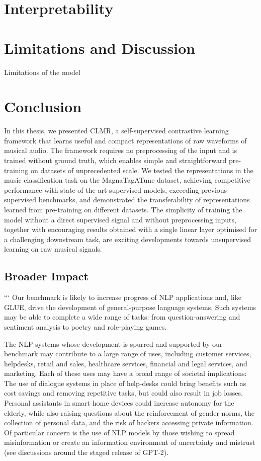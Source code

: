 \documentclass{report}
\begin{document}
\chapter{Interpretability}


\chapter{Limitations and Discussion}
Limitations of the model


\chapter{Conclusion}
In this thesis, we presented CLMR, a self-supervised contrastive learning framework that learns useful and compact representations of raw waveforms of musical audio. The framework requires no preprocessing of the input and is trained without ground truth, which enables simple and straightforward pre-training on datasets of unprecedented scale. We tested the representations in the music classification task on the MagnaTagATune dataset, achieving competitive performance with state-of-the-art supervised models, exceeding previous supervised benchmarks, and demonstrated the transferability of representations learned from pre-training on different datasets. The simplicity of training the model without a direct supervised signal and without preprocessing inputs, together with encouraging results obtained with a single linear layer optimised for a challenging downstream task, are exciting developments towards unsupervised learning on raw musical signals.

\section{Broader Impact}
```
Our benchmark is likely to increase progress of NLP applications and, like GLUE, drive the development of general-purpose language systems. Such systems may be able to complete a wide range of tasks: from question-answering and sentiment analysis to poetry and role-playing games.

The NLP systems whose development is spurred and supported by our benchmark may contribute to a large range of uses, including customer services, helpdesks, retail and sales, healthcare services, financial and legal services, and marketing. Each of these uses may have a broad range of societal implications: The use of dialogue systems in place of help-desks could bring benefits such as cost savings and removing repetitive tasks, but could also result in job losses. Personal assistants in smart home devices could increase autonomy for the elderly, while also raising questions about the reinforcement of gender norms, the collection of personal data, and the risk of hackers accessing private information. Of particular concern is the use of NLP models by those wishing to spread misinformation or create an information environment of uncertainty and mistrust (see discussions around the staged release of GPT-2).
\end{document}
